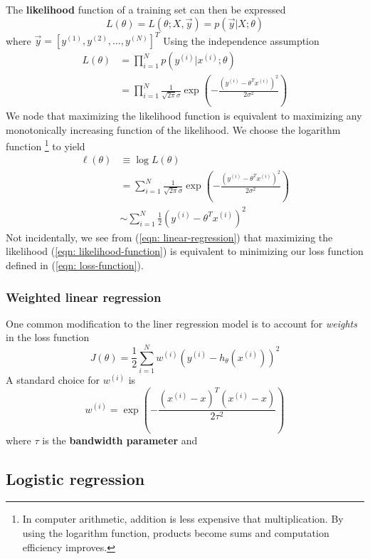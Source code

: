 \documentclass{article}
\theoremstyle{definition}
\theoremstyle{remark}
\begin{document}
The \textbf{likelihood} function of a training set can then be expressed
\begin{equation}
    L(\theta) = L(\theta; X, \vec{y}) = p (\vec{y}|X;\theta)
\end{equation}
where $\vec{y} = [y^{(1)}, y^{(2)}, \dots, y^{(N)}]^{T}$
Using the independence assumption
\begin{align}
    L(\theta) &= \prod_{i=1}^{N}p(y^{(i)}|x^{(i)}; \theta) \nonumber \\
    &= \prod_{i=1}^{N} \frac{1}{\sqrt{2\pi}\sigma}\exp\left(-\frac{(y^{(i)} - \theta^{T}x^{(i)})^{2}}{2\sigma^{2}}\right) 
\end{align}
We node that maximizing the likelihood function is equivalent to maximizing any monotonically increasing function of the likelihood.
We choose the logarithm function \footnote{In computer arithmetic, addition is less expensive that multiplication. By using the logarithm function, products become sums and computation efficiency improves.} to yield
\begin{align}
    \ell(\theta) &\equiv \log L(\theta) \nonumber \\
    &= \sum_{i=1}^{N} \frac{1}{\sqrt{2\pi}\sigma}\exp\left(-\frac{(y^{(i)} - \theta^{T}x^{(i)})^{2}}{2\sigma^{2}}\right) \nonumber \\
    &\sim \sum_{i=1}^{N}\frac{1}{2}\left(y^{(i)} - \theta^{T}x^{(i)}\right)^{2} \label{eqn: likelihood-function}
\end{align}
Not incidentally, we see from (\ref{eqn: linear-regression}) that maximizing the likelihood  (\ref{eqn: likelihood-function}) is equivalent to minimizing our loss function defined in (\ref{eqn: loss-function}).

\subsubsection{Weighted linear regression}
One common modification to the liner regression model is to account for \textit{weights} in the loss function
\begin{equation}
    J(\theta) = \frac{1}{2}\sum_{i=1}^{N}w^{(i)}\left(y^{(i)} - h_{\theta}(x^{(i)})\right)^{2}
\end{equation}
A standard choice for $w^{(i)}$ is
\begin{equation}
    w^{(i)} = \exp\left(-\frac{(x^{(i)} - x)^{T}(x^{(i)}-x)}{2\tau^{2}}\right)
\end{equation}
where $\tau$ is the \textbf{bandwidth parameter} and  

\subsection{Logistic regression}
\end{document}
